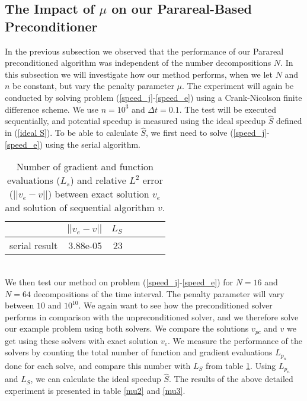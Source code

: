 \subsection{The Impact of $\mu$ on our Parareal-Based Preconditioner}
In the previous subsection we observed that the performance of our Parareal preconditioned algorithm was independent of the number decompositions $N$. In this subsection we will investigate how our method performs, when we let $N$ and $n$ be constant, but vary the penalty parameter $\mu$. The experiment will again be conducted by solving problem (\ref{speed_j}-\ref{speed_e}) using a Crank-Nicolson finite difference scheme. We use $n=10^3$ and $\Delta t=0.1$. The test will be executed sequentially, and potential speedup is measured using the ideal speedup $\hat S$ defined in (\ref{ideal S}). To be able to calculate $\hat S$, we first need to solve (\ref{speed_j}-\ref{speed_e}) using the serial algorithm.
\\ 
\begin{table}[h]
\centering
\caption{Number of gradient and function evaluations ($L_s$) and relative $L^2$ error ($||v_e-v||$) between exact solution $v_e$ and solution of sequential algorithm $v$.} \label{mu1}
\begin{tabular}{lrrllrr}
\toprule
{}  &  $||v_e-v||$  &  $L_S$  \\
\midrule
serial result  &     3.88e-05 &   23    \\
\bottomrule
\end{tabular}
\end{table}
\\
We then test our method on problem (\ref{speed_j}-\ref{speed_e}) for $N=16$ and $N=64$ decompositions of the time interval. The penalty parameter will vary between $10$ and $10^10$. We again want to see how the preconditioned solver performs in comparison with the unpreconditioned solver, and we therefore solve our example problem using both solvers. We compare the solutions $v_{pc}$ and $v$ we get using these solvers with exact solution $v_e$. We measure the performance of the solvers by counting the total number of function and gradient evaluations $L_{p_n}$ done for each solve, and compare this number with $L_S$ from table \ref{mu1}. Using $L_{p_n}$ and $L_S$, we can calculate the ideal speedup $\hat S$. The results of the above detailed experiment is presented in table \ref{mu2} and \ref{mu3}.
\\
